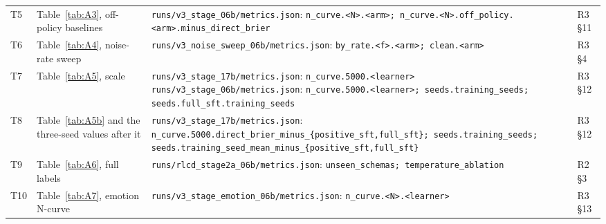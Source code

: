 \documentclass[10pt,letterpaper]{article}
\theoremstyle{plain}
\begin{document}
{\begin{longtable}{@{}p{}>{\raggedright\arraybackslash}p{}>{\raggedright\arraybackslash}p{}>{\raggedright\arraybackslash}p{}@{}}
T5 & Table~\ref{tab:A3}, off-policy baselines & \texttt{runs/\allowbreak{}v3\_\allowbreak{}stage\_\allowbreak{}06b/\allowbreak{}metrics.\allowbreak{}json}: \texttt{n\_\allowbreak{}curve.\allowbreak{}\textless{}N\textgreater{}.\allowbreak{}\textless{}arm\textgreater{};\allowbreak{} n\_\allowbreak{}curve.\allowbreak{}\textless{}N\textgreater{}.\allowbreak{}off\_\allowbreak{}policy.\allowbreak{}\textless{}arm\textgreater{}.\allowbreak{}minus\_\allowbreak{}direct\_\allowbreak{}brier} & R3 \S11 \\
T6 & Table~\ref{tab:A4}, noise-rate sweep & \texttt{runs/\allowbreak{}v3\_\allowbreak{}noise\_\allowbreak{}sweep\_\allowbreak{}06b/\allowbreak{}metrics.\allowbreak{}json}: \texttt{by\_\allowbreak{}rate.\allowbreak{}\textless{}f\textgreater{}.\allowbreak{}\textless{}arm\textgreater{};\allowbreak{} clean.\allowbreak{}\textless{}arm\textgreater{}} & R3 \S4 \\
T7 & Table~\ref{tab:A5}, scale & \texttt{runs/\allowbreak{}v3\_\allowbreak{}stage\_\allowbreak{}17b/\allowbreak{}metrics.\allowbreak{}json}: \texttt{n\_\allowbreak{}curve.\allowbreak{}5000.\allowbreak{}\textless{}learner\textgreater{}} \newline \texttt{runs/\allowbreak{}v3\_\allowbreak{}stage\_\allowbreak{}06b/\allowbreak{}metrics.\allowbreak{}json}: \texttt{n\_\allowbreak{}curve.\allowbreak{}5000.\allowbreak{}\textless{}learner\textgreater{};\allowbreak{} seeds.\allowbreak{}training\_\allowbreak{}seeds;\allowbreak{} seeds.\allowbreak{}full\_\allowbreak{}sft.\allowbreak{}training\_\allowbreak{}seeds} & R3 \S12 \\
T8 & Table~\ref{tab:A5b} and the three-seed values after it & \texttt{runs/\allowbreak{}v3\_\allowbreak{}stage\_\allowbreak{}17b/\allowbreak{}metrics.\allowbreak{}json}: \texttt{n\_\allowbreak{}curve.\allowbreak{}5000.\allowbreak{}direct\_\allowbreak{}brier\_\allowbreak{}minus\_\allowbreak{}\{positive\_\allowbreak{}sft,full\_\allowbreak{}sft\};\allowbreak{} seeds.\allowbreak{}training\_\allowbreak{}seeds;\allowbreak{} seeds.\allowbreak{}training\_\allowbreak{}seed\_\allowbreak{}mean\_\allowbreak{}minus\_\allowbreak{}\{positive\_\allowbreak{}sft,full\_\allowbreak{}sft\}} & R3 \S12 \\
T9 & Table~\ref{tab:A6}, full labels & \texttt{runs/\allowbreak{}rlcd\_\allowbreak{}stage2a\_\allowbreak{}06b/\allowbreak{}metrics.\allowbreak{}json}: \texttt{unseen\_\allowbreak{}schemas;\allowbreak{} temperature\_\allowbreak{}ablation} & R2 \S3 \\
T10 & Table~\ref{tab:A7}, emotion N-curve & \texttt{runs/\allowbreak{}v3\_\allowbreak{}stage\_\allowbreak{}emotion\_\allowbreak{}06b/\allowbreak{}metrics.\allowbreak{}json}: \texttt{n\_\allowbreak{}curve.\allowbreak{}\textless{}N\textgreater{}.\allowbreak{}\textless{}learner\textgreater{}} & R3 \S13 \\

\end{longtable}}
\end{document}
